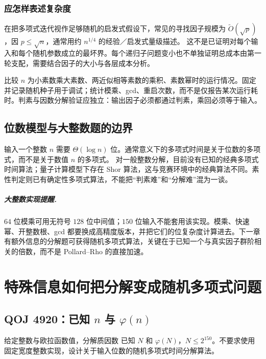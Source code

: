 \documentclass[UTF8,a4paper,11pt,oneside,openany,fontset=fandol]{ctexbook}
\theoremstyle{definition}
\begin{document}
\subsection{应怎样表述复杂度}
在把多项式迭代视作足够随机的启发式假设下，常见的寻找因子规模为 $\widetilde O(\sqrt p)$，因 $p\le\sqrt n$，通常用约 $n^{1/4}$ 的经验／启发式量级描述。
这不是已证明对每个输入和每个随机参数成立的最坏界。每个递归子问题变小也不单独证明总成本由第一轮支配，需要结合因子的大小与各层成本分析。

\begin{teach}[给学生的实验任务]
比较 $n$ 为小素数乘大素数、两近似相等素数的乘积、素数幂时的运行情况。固定并记录随机种子用于调试；统计模乘、gcd、重启次数，而不是仅报告某次运行耗时。判素与因数分解验证应独立：输出因子必须都通过判素，乘回必须等于输入。
\end{teach}


\section{位数模型与大整数题的边界}
输入一个整数 $n$ 需要 $\Theta(\log n)$ 位。通常意义下的多项式时间是关于位数的多项式，而不是关于数值 $n$ 的多项式。
对一般整数分解，目前没有已知的经典多项式时间算法；量子计算模型下存在 Shor 算法，这与竞赛环境中的经典算法不同。素性判定则已有确定性多项式算法，不能把“判素难”和“分解难”混为一谈。

\paragraph{大整数实现提醒.} $64$ 位模乘可用无符号 $128$ 位中间值；$150$ 位输入不能套用该实现。模乘、快速幂、开整数根、gcd 都要换成高精度版本，并把它们的位复杂度计算进去。下一章有额外信息的分解题可获得随机多项式算法，关键在于已知一个与真实因子群阶相关的倍数，而不是 Pollard--Rho 的直接加速。



\chapter{特殊信息如何把分解变成随机多项式问题}
\section{QOJ 4920：已知 \texorpdfstring{$n$}{n} 与 \texorpdfstring{$\varphi(n)$}{phi(n)}}
\begin{problem}{给定整数与欧拉函数值，分解质因数}
已知 $N$ 和 $\varphi(N)$，$N\le2^{150}$。不要求使用固定宽度整数实现，设计关于输入位数的随机多项式时间分解算法。
\end{problem}
\end{document}
